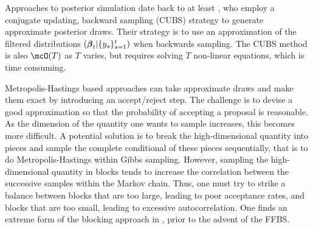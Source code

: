 
\npoint Approaches to posterior simulation date back to at least
\citet{west-etal-1985}, who employ a conjugate updating, backward sampling
(CUBS) strategy to generate approximate posterior draws.  Their strategy is to
use an approximation of the filtered distributions $(\boldsymbol{\beta}_t |
\{y_s\}_{s=1}^t)$ when backwards sampling.  The CUBS method is also $\mcO(T)$ as
$T$ varies, but requires solving $T$ non-linear equations, which is time
consuming.

\npoint Metropolis-Hastings based approaches can take approximate draws and make
them exact by introducing an accept/reject step.  The challenge is to devise a
good approximation so that the probability of accepting a proposal is
reasonable.  As the dimension of the quantity one wants to sample increases,
this becomes more difficult.  A potential solution is to break the
high-dimensional quantity into pieces and sample the complete conditional of
these pieces sequentially, that is to do Metropolis-Hastings within Gibbs
sampling.  However, sampling the high-dimensional quantity in blocks tends to
increase the correlation between the successive samples within the Markov chain.
Thus, one must try to strike a balance between blocks that are too large,
leading to poor acceptance rates, and blocks that are too small, leading to
excessive autocorrelation.  One finds an extreme form of the blocking approach
in \citet{carlin-etal-1992}, prior to the advent of the FFBS.

